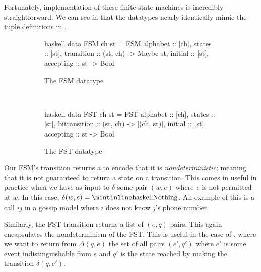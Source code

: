 \documentclass[ %
                    author={Leo Poulson},
                supervisor={Dr. Steven Ramsay},
                    degree={BSc},
                     title={Epistemic Planning for the Dynamic Gossip problem},
                  subtitle={},
                      year={2019} ]{dissertation}
\begin{document}
Fortunately, implementation of these finite-state machines is incredibly
straightforward. We can see in  that the datatypes nearly
identically mimic the tuple definitions in .


\begin{figure}[h]
  \centering
  \begin{subfigure}[b]{0.5\textwidth}
    \begin{cminted}{haskell}
      data FSM ch st = FSM {
        alphabet :: [ch],              
        states :: [st],               
        transition :: (st, ch) -> Maybe st,
        initial :: [st],            
        accepting :: st -> Bool    
       }
    \end{cminted}
    \caption{The FSM datatype}
  \end{subfigure}%
~
  \begin{subfigure}[b]{0.5\textwidth}
    \begin{cminted}{haskell}
      data FST ch st = FST {
        alphabet :: [ch],                     
        states :: [st],                       
        bitransition :: (st, ch) -> [(ch, st)],
        initial :: [st],                      
        accepting :: st -> Bool              
      }
    \end{cminted}
    \caption{The FST datatype}
  \end{subfigure}
  \caption{}
  \label{fig:FSMFST}
\end{figure}

Our FSM's transition returns a  to encode that it is
\emph{nondeterministic}; meaning that it is not guaranteed to return a state on
a transition. This comes in useful in practice when we have as input to $\delta$
some pair $(w, e)$ where $e$ is not permitted at $w$. In this case, $\delta(w,
e) = \text{\mih{Nothing}}$. An example of this is a call $ij$ in a gossip model
where $i$ does not know $j$'s phone number.

Similarly, the FST transition returns a list of $(e, q)$ pairs. This again
encapsulates the nondeterminism of the FST. This is useful in the case of
, where we want to return from
$\Delta(q, e)$ the set of all pairs $(e', q')$ where $e'$ is some event
indistinguishable from $e$ and $q'$ is the state reached by making the
transition $\delta(q, e')$.
\end{document}

